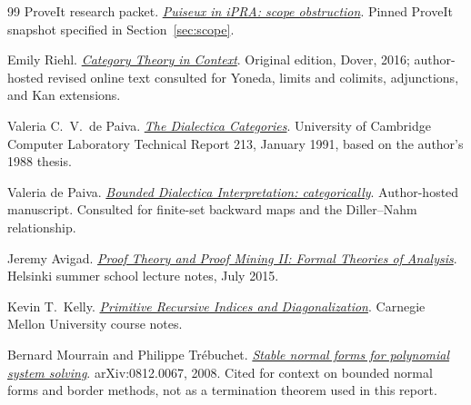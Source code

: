 \begin{thebibliography}{99}
 ProveIt research packet.
\href{https://github.com/VladimirReshetnikov/ProveIt/blob/bb86091690bc4f920f046a37cfc87719299b4019/Logic/PrimitiveRecursiveArithmetic/docs/proofs/algebra/puiseux_ipra/evidence/scope_obstruction.md}{\emph{Puiseux in iPRA: scope obstruction}}.
Pinned ProveIt snapshot specified in Section~\ref{sec:scope}.

 Emily Riehl.
\href{https://emilyriehl.github.io/files/context.pdf}{\emph{Category Theory in Context}}.
Original edition, Dover, 2016; author-hosted revised online text consulted
for Yoneda, limits and colimits, adjunctions, and Kan extensions.

 Valeria C.\ V.\ de Paiva.
\href{https://www.cl.cam.ac.uk/techreports/UCAM-CL-TR-213.html}{\emph{The Dialectica Categories}}.
University of Cambridge Computer Laboratory Technical Report 213,
January 1991, based on the author's 1988 thesis.

 Valeria de Paiva.
\href{https://vcvpaiva.github.io/includes/pubs/2015boundedDial.pdf}{\emph{Bounded Dialectica Interpretation: categorically}}.
Author-hosted manuscript. Consulted for finite-set backward maps and
the Diller--Nahm relationship.

 Jeremy Avigad.
\href{https://www.andrew.cmu.edu/user/avigad/Talks/helsinki/helsinki2.pdf}{\emph{Proof Theory and Proof Mining II: Formal Theories of Analysis}}.
Helsinki summer school lecture notes, July 2015.

 Kevin T.\ Kelly.
\href{https://www.andrew.cmu.edu/user/kk3n/recursionclass/2prindex.html}{\emph{Primitive Recursive Indices and Diagonalization}}.
Carnegie Mellon University course notes.

 Bernard Mourrain and Philippe Tr\'ebuchet.
\href{https://arxiv.org/abs/0812.0067}{\emph{Stable normal forms for polynomial system solving}}.
arXiv:0812.0067, 2008. Cited for context on bounded normal forms and
border methods, not as a termination theorem used in this report.

\end{thebibliography}
